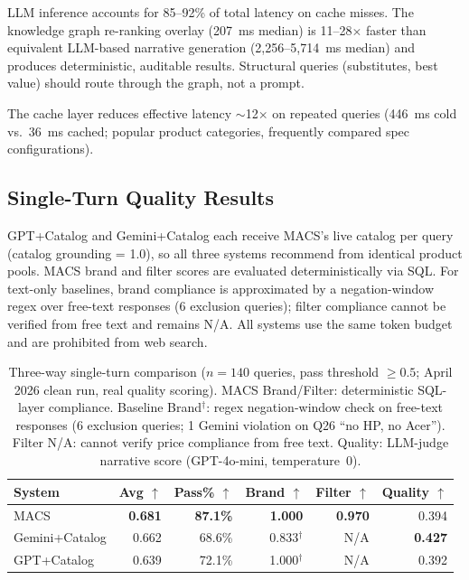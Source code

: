\documentclass[sigconf,anonymous]{acmart}
\newcommand{\GPTCatalog}{GPT\allowbreak{}+\allowbreak{}Catalog}
\newcommand{\GeminiCatalog}{Gemini\allowbreak{}+\allowbreak{}Catalog}
\begin{document}
LLM inference accounts for 85--92\% of total latency on cache misses.
The knowledge graph re-ranking overlay (207~ms median) is 11--28$\times$ faster
than equivalent LLM-based narrative generation (2,256--5,714~ms median) and
produces deterministic, auditable results. Structural queries (substitutes,
best value) should route through the graph, not a prompt.

The cache layer reduces effective latency $\sim$12$\times$ on repeated queries
(446~ms cold vs.\ 36~ms cached; popular product categories, frequently compared
spec configurations).

\subsection{Single-Turn Quality Results}

\GPTCatalog{} and \GeminiCatalog{} each receive MACS's live catalog per
query (catalog grounding = 1.0), so all three systems recommend from identical
product pools. MACS brand and filter scores are evaluated deterministically via SQL.
For text-only baselines, brand compliance is approximated by a
negation-window regex over free-text responses (6 exclusion queries);
filter compliance cannot be verified from free text and remains N/A.
All systems use the same token budget and are prohibited from web search.

\begin{table}[t]
  \caption{Three-way single-turn comparison ($n = 140$ queries, pass
  threshold $\geq 0.5$; April 2026 clean run, real quality scoring).
  MACS Brand/Filter: deterministic SQL-layer compliance.
  Baseline Brand$^\dagger$: regex negation-window check on free-text responses
  (6 exclusion queries; 1 Gemini violation on Q26 ``no HP, no Acer'').
  Filter N/A: cannot verify price compliance from free text.
  Quality: LLM-judge narrative score (GPT-4o-mini, temperature~0).}
  \label{tab:results160}
  \begin{tabular}{lrrrrr}
    \toprule
    System & Avg $\uparrow$ & Pass\% $\uparrow$ & Brand $\uparrow$ & Filter $\uparrow$ & Quality $\uparrow$ \\
    \midrule
    MACS             & \textbf{0.681} & \textbf{87.1\%} & \textbf{1.000} & \textbf{0.970} & 0.394 \\
    \GeminiCatalog{} & 0.662          & 68.6\%          & 0.833$^\dagger$ & N/A   & \textbf{0.427} \\
    \GPTCatalog{}    & 0.639          & 72.1\%          & 1.000$^\dagger$ & N/A   & 0.392 \\
    \bottomrule
  \end{tabular}
\end{table}
\end{document}

